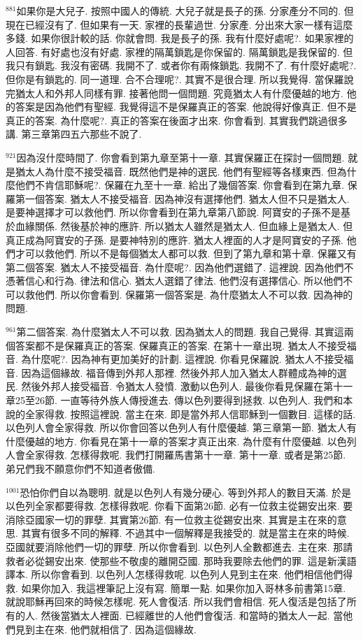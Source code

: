 \documentclass{book}
\begin{document}
$^{881}$如果你是大兒子.
按照中國人的傳統.
大兒子就是長子的孫.
分家產分不同的.
但現在已經沒有了.
但如果有一天.
家裡的長輩過世.
分家產.
分出來大家一樣有這麼多錢.
如果你很計較的話.
你就會問.
我是長子的孫.
我有什麼好處呢?.
如果家裡的人回答.
有好處也沒有好處.
家裡的隔萬鎖匙是你保留的.
隔萬鎖匙是我保留的.
但我只有鎖匙.
我沒有密碼.
我開不了.
或者你有兩條鎖匙.
我開不了.
有什麼好處呢?.
但你是有鎖匙的.
同一道理.
合不合理呢?.
其實不是很合理.
所以我覺得.
當保羅說完猶太人和外邦人同樣有罪.
接著他問一個問題.
究竟猶太人有什麼優越的地方.
他的答案是因為他們有聖經.
我覺得這不是保羅真正的答案.
他說得好像真正.
但不是真正的答案.
為什麼呢?.
真正的答案在後面才出來.
你會看到.
其實我們跳過很多講.
第三章第四五六那些不說了.

$^{921}$因為沒什麼時間了.
你會看到第九章至第十一章.
其實保羅正在探討一個問題.
就是猶太人為什麼不接受福音.
既然他們是神的選民.
他們有聖經等各樣東西.
但為什麼他們不肯信耶穌呢?.
保羅在九至十一章.
給出了幾個答案.
你會看到在第九章.
保羅第一個答案.
猶太人不接受福音.
因為神沒有選擇他們.
猶太人但不只是猶太人.
是要神選擇才可以救他們.
所以你會看到在第九章第八節說.
阿寶安的子孫不是基於血緣關係.
然後基於神的應許.
所以猶太人雖然是猶太人.
但血緣上是猶太人.
但真正成為阿寶安的子孫.
是要神特別的應許.
猶太人裡面的人才是阿寶安的子孫.
他們才可以救他們.
所以不是每個猶太人都可以救.
但到了第九章和第十章.
保羅又有第二個答案.
猶太人不接受福音.
為什麼呢?.
因為他們選錯了.
這裡說.
因為他們不憑著信心和行為.
律法和信心.
猶太人選錯了律法.
他們沒有選擇信心.
所以他們不可以救他們.
所以你會看到.
保羅第一個答案是.
為什麼猶太人不可以救.
因為神的問題.

$^{961}$第二個答案.
為什麼猶太人不可以救.
因為猶太人的問題.
我自己覺得.
其實這兩個答案都不是保羅真正的答案.
保羅真正的答案.
在第十一章出現.
猶太人不接受福音.
為什麼呢?.
因為神有更加美好的計劃.
這裡說.
你看見保羅說.
猶太人不接受福音.
因為這個緣故.
福音傳到外邦人那裡.
然後外邦人加入猶太人群體成為神的選民.
然後外邦人接受福音.
令猶太人發憤.
激動以色列人.
最後你看見保羅在第十一章25至26節.
一直等待外族人傳授進去.
傳以色列要得到拯救.
以色列人.
我們和本說的全家得救.
按照這裡說.
當主在來.
即是當外邦人信耶穌到一個數目.
這樣的話.
以色列人會全家得救.
所以你會回答以色列人有什麼優越.
第三章第一節.
猶太人有什麼優越的地方.
你看見在第十一章的答案才真正出來.
為什麼有什麼優越.
以色列人會全家得救.
怎樣得救呢.
我們打開羅馬書第十一章.
第十一章.
或者是第25節.
弟兄們我不願意你們不知道者傲備.

$^{1001}$恐怕你們自以為聰明.
就是以色列人有幾分硬心.
等到外邦人的數目天滿.
於是以色列全家都要得救.
怎樣得救呢.
你看下面第26節.
必有一位救主從錫安出來.
要消除亞國家一切的罪孽.
其實第26節.
有一位救主從錫安出來.
其實是主在來的意思.
其實有很多不同的解釋.
不過其中一個解釋是我接受的.
就是當主在來的時候.
亞國就要消除他們一切的罪孽.
所以你會看到.
以色列人全數都進去.
主在來.
那請救者必從錫安出來.
使那些不敬虔的離開亞國.
那時我要除去他們的罪.
這是新漢語譯本.
所以你會看到.
以色列人怎樣得救呢.
以色列人見到主在來.
他們相信他們得救.
如果你加入.
我這裡筆記上沒有寫.
簡單一點.
如果你加入哥林多前書第15章.
就說耶穌再回來的時候怎樣呢.
死人會復活.
所以我們會相信.
死人復活是包括了所有的人.
然後當猶太人裡面.
已經離世的人他們會復活.
和當時的猶太人一起.
當他們見到主在來.
他們就相信了.
因為這個緣故.
\end{document}
